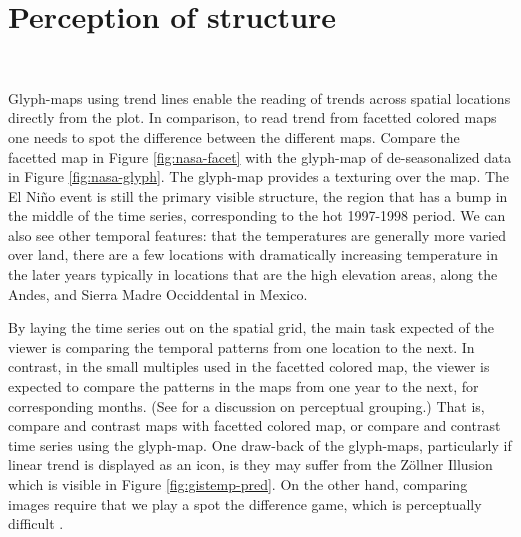 \documentclass[oneside]{article}
\begin{document}




\section{Perception of structure}~\label{sec:perception}


Glyph-maps using trend lines enable the reading of trends across spatial locations directly from the plot. In comparison, to read trend from facetted colored maps one needs to spot the difference between the different maps.  Compare the facetted map in Figure \ref{fig:nasa-facet} with the glyph-map of de-seasonalized data in Figure \ref{fig:nasa-glyph}. The glyph-map provides a texturing over the map. The El Ni\~no event is still the primary visible structure, the region that has a bump in the middle of the time series, corresponding to the hot 1997-1998 period. We can also see other temporal features: that the temperatures are generally more varied over land, there are a few locations with dramatically increasing temperature in the later years typically in locations that are the high elevation areas, along the Andes, and Sierra Madre Occiddental in Mexico.

By laying the time series out on the spatial grid, the main task expected of the viewer is comparing the temporal patterns from one location to the next. In contrast, in the small multiples used in the facetted colored map, the viewer is expected to compare the patterns in the maps from one year to the next, for corresponding months. (See \citet{carr:1999} for a discussion on perceptual grouping.) That is, compare and contrast maps with facetted colored map, or compare and contrast time series using the glyph-map. One draw-back of the glyph-maps, particularly if linear trend is displayed as an icon, is they may suffer from the Z\"ollner Illusion \citep{Zollner} which is visible in Figure \ref{fig:gistemp-pred}. On the other hand, comparing images require that we play a spot the difference game, which is perceptually difficult \citet{busey}.
\end{document}
